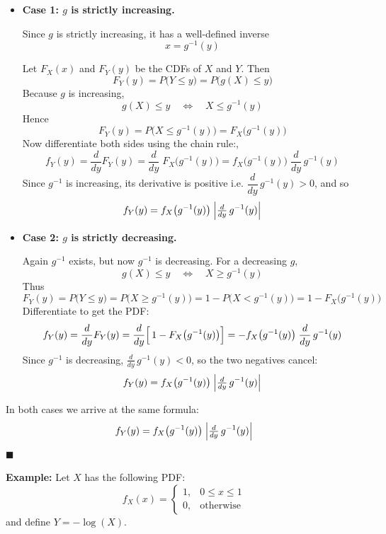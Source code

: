 \documentclass[twoside]{book}
\begin{document}
\begin{itemize}
\item  \textbf{Case 1: $g$ is strictly increasing.}

    Since $g$ is strictly increasing, it has a well-defined inverse
    \[
      x = g^{-1}(y)
    \]

    Let $F_X(x)$ and $F_Y(y)$ be the CDFs of $X$ and $Y$.  Then
    \[
      F_Y(y)
      = P\bigl(Y \le y\bigr)
      = P\bigl(g(X)\le y\bigr)
    \]
    Because $g$ is increasing, 
    \[
      g(X)\le y 
      \quad\Longleftrightarrow\quad
      X \le g^{-1}(y)
    \]
    Hence
    \[
      F_Y(y)
      = P\bigl(X \le g^{-1}(y)\bigr)
      = F_X\bigl(g^{-1}(y)\bigr)
    \]
  Now differentiate both sides using the chain rule:,
    \[
      f_Y(y)
      = \frac{d}{dy}F_Y(y)
      = \frac{d}{dy}\;F_X\bigl(g^{-1}(y)\bigr)
      = f_X\bigl(g^{-1}(y)\bigr)\;\frac{d}{dy}\,g^{-1}(y)
    \]
    Since $g^{-1}$ is increasing, its derivative is positive i.e. $\dfrac{d}{dy}\,g^{-1}(y) > 0$, and so
    \[
      f_Y(y) 
      = f_X\bigl(g^{-1}(y)\bigr)\;\Bigl|\tfrac{d}{dy}\,g^{-1}(y)\Bigr|
    \]


\medskip
\item \textbf{Case 2: $g$ is strictly decreasing.}

 
    Again $g^{-1}$ exists, but now $g^{-1}$ is decreasing.
    For a decreasing $g$,
    \[
      g(X)\le y 
      \quad\Longleftrightarrow\quad
      X \ge g^{-1}(y)
    \]
    Thus
    \[
      F_Y(y)
      = P\bigl(Y \le y\bigr)
      = P\bigl(X \ge g^{-1}(y)\bigr)
      = 1 - P\bigl(X < g^{-1}(y)\bigr)
      = 1 - F_X\bigl(g^{-1}(y)\bigr)
    \]
  Differentiate to get the PDF:
    \[
      f_Y(y)
      = \frac{d}{dy}F_Y(y)
      = \frac{d}{dy}\Bigl[\,1 - F_X\bigl(g^{-1}(y)\bigr)\Bigr]
      = -f_X\bigl(g^{-1}(y)\bigr)\;\frac{d}{dy}\,g^{-1}(y)
    \]
    Since $g^{-1}$ is decreasing, $\tfrac{d}{dy}\,g^{-1}(y)<0$, so the two negatives cancel:
    \[
      f_Y(y)
      = f_X\bigl(g^{-1}(y)\bigr)\;\Bigl|\tfrac{d}{dy}\,g^{-1}(y)\Bigr|
    \]
\end{itemize}
\medskip
\noindent In both cases we arrive at the same formula:
\[
  f_Y(y)
  = f_X\bigl(g^{-1}(y)\bigr)\;\Bigl|\tfrac{d}{dy}\,g^{-1}(y)\Bigr|
\]
\hfill\(\blacksquare\)

\vspace{2mm}

\textbf{Example:} Let $X$ has the following PDF:
\[
f_X(x) =
\begin{cases}
1, & 0 \le x \le 1 \\
0, & \text{otherwise}
\end{cases}
\]
and define $Y = -\log(X)$.
\end{document}
